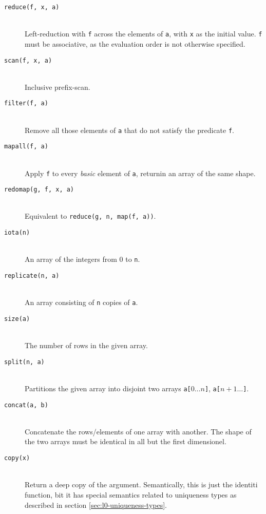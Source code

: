 \documentclass[oneside]{memoir}
\begin{document}
\begin{description}
  \item[\texttt{reduce(f, x, a)}]\hfill\\
    Left-reduction with \texttt{f} across the elements of \texttt{a}, with \texttt{x} as the initial value.  \texttt{f} must be associative, as the evaluation order is not otherwise specified.

  \item[\texttt{scan(f, x, a)}]\hfill\\
    Inclusive prefix-scan.

  \item[\texttt{filter(f, a)}]\hfill\\
    Remove all those elements of \texttt{a} that do not satisfy the predicate \texttt{f}.

  \item[\texttt{mapall(f, a)}]\hfill\\
    Apply \texttt{f} to every \emph{basic} element of \texttt{a}, returnin an array of the same shape.

  \item[\texttt{redomap(g, f, x, a)}]\hfill\\
    Equivalent to \texttt{reduce(g, n, map(f, a))}.

  \item[\texttt{iota(n)}]\hfill\\
    An array of the integers from $0$ to \texttt{n}.

  \item[\texttt{replicate(n, a)}]\hfill\\
    An array consisting of \texttt{n} copies of \texttt{a}.

  \item[\texttt{size(a)}]\hfill\\
    The number of rows in the given array.

  \item[\texttt{split(n, a)}]\hfill\\
    Partitions the given array into disjoint two arrays \texttt{a[$0\ldots{}n$]}, \texttt{a[$n+1\ldots{}$]}.

  \item[\texttt{concat(a, b)}]\hfill\\
    Concatenate the rows/elements of one array with another.  The shape of the two arrays must be identical in all but the first dimensionel.

  \item[\texttt{copy(x)}]\hfill\\
    Return a deep copy of the argument.  Semantically, this is just the identiti function, bit it has special semantics related to uniqueness types as described in section \ref{sec:l0-uniqueness-types}.


\end{description}
\end{document}
